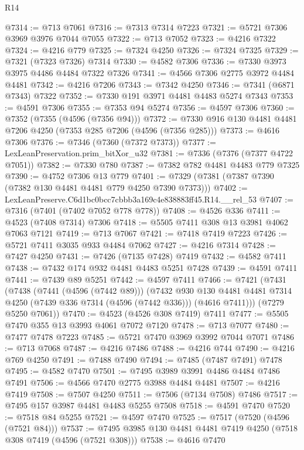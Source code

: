 \begin{lexlean}{R14}
\begin{coremodule}
@7314 := @713 @7061
@7316 := @7313 @7314 @7223
@7321 := @5721 @7306 @3969 @3976 @7044 @7055
@7322 := @713 @7052
@7323 := @4216 @7322
@7324 := @4216 @779
@7325 := @7324 @4250
@7326 := @7324 @7325
@7329 := @7321 (@7323 @7326) @7314
@7330 := @4582 @7306
@7336 := @7330 @3973 @3975 @4486 @4484 @7322 @7326
@7341 := @4566 @7306 @2775 @3972 @4484 @4481
@7342 := @4216 @7206
@7343 := @7342 @4250
@7346 := @7341 (@6871 @7343) @7322
@7352 := @7330 @191 @3971 @4481 @4483 @5274 @7343
@7353 := @4591 @7306
@7355 := @7353 @94 @5274
@7356 := @4597 @7306
@7360 := @7352 (@7355 (@4596 (@7356 @94)))
@7372 := @7330 @916 @130 @4481 @4481 @7206 @4250 (@7353 @285 @7206 (@4596 (@7356 @285)))
@7373 := @4616 @7306
@7376 := @7346 (@7360 (@7372 @7373))
@7377 := LexLeanPreservation.prim_bitXor_u32
@7381 := @7336 (@7376 (@7377 @4722 @7051))
@7382 := @7330 @780
@7387 := @7382 @782 @4481 @4483 @779 @7325
@7390 := @4752 @7306 @13 @779
@7401 := @7329 (@7381 (@7387 @7390 (@7382 @130 @4481 @4481 @779 @4250 @7390 @7373)))
@7402 := LexLeanPreserve.C6d1bc0bcc7cbbb3a169c4e838883ff45.R14.__rel_53
@7407 := @7316 (@7401 (@7402 @7052 @778 @778))
@7408 := @4526 @336
@7411 := @4523 (@7408 @7314) @7306
@7418 := @5505 @7411 @308 @13 @3981 @4062 @7063 @7121
@7419 := @713 @7067
@7421 := @7418 @7419 @7223
@7426 := @5721 @7411 @3035 @933 @4484 @7062
@7427 := @4216 @7314
@7428 := @7427 @4250
@7431 := @7426 (@7135 @7428) @7419
@7432 := @4582 @7411
@7438 := @7432 @174 @932 @4481 @4483 @5251 @7428
@7439 := @4591 @7411
@7441 := @7439 @89 @5251
@7442 := @4597 @7411
@7466 := @7421
    (@7431
      (@7438
        (@7441 (@4596 (@7442 @89)))
        (@7432
          @930
          @130
          @4481
          @4481
          @7314
          @4250
          (@7439 @336 @7314 (@4596 (@7442 @336)))
          (@4616 @7411)))
      (@7279 @5250 @7061))
@7470 := @4523 (@4526 @308 @7419) @7411
@7477 := @5505 @7470 @355 @13 @3993 @4061 @7072 @7120
@7478 := @713 @7077
@7480 := @7477 @7478 @7223
@7485 := @5721 @7470 @3969 @3992 @7044 @7071
@7486 := @713 @7068
@7487 := @4216 @7486
@7488 := @4216 @744
@7490 := @4216 @769 @4250
@7491 := @7488 @7490
@7494 := @7485 (@7487 @7491) @7478
@7495 := @4582 @7470
@7501 := @7495 @3989 @3991 @4486 @4484 @7486 @7491
@7506 := @4566 @7470 @2775 @3988 @4484 @4481
@7507 := @4216 @7419
@7508 := @7507 @4250
@7511 := @7506 (@7134 @7508) @7486
@7517 := @7495 @157 @3987 @4481 @4483 @5255 @7508
@7518 := @4591 @7470
@7520 := @7518 @84 @5255
@7521 := @4597 @7470
@7525 := @7517 (@7520 (@4596 (@7521 @84)))
@7537 := @7495 @3985 @130 @4481 @4481 @7419 @4250 (@7518 @308 @7419 (@4596 (@7521 @308)))
@7538 := @4616 @7470

\end{coremodule}
\end{lexlean}
